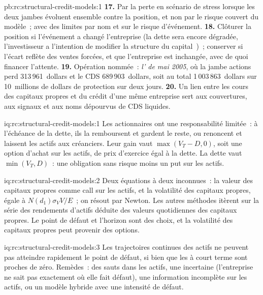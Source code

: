 \begin{solution}{pb:rc:structural-credit-models:1}
\textbf{17.} Par la perte en scénario de stress lorsque les deux jambes évoluent ensemble contre la position, et non par le
risque couvert du modèle~; avec des limites par nom et sur le risque d'événement.
\textbf{18.} Clôturer la position si l'événement a changé l'entreprise (la dette sera encore dégradée, l'investisseur
a l'intention de modifier la structure du capital~)~; conserver si l'écart reflète des ventes
forcées, et que l'entreprise est inchangée, avec de quoi financer l'attente.
\textbf{19.} Opération nommée~: \emph{l' de mai 2005}, où la jambe actions
perd 313\,961~dollars et le CDS 689\,903~dollars, soit au total 1\,003\,863~dollars sur
10~millions de dollars de protection sur deux jours.
\textbf{20.} Un lien entre les cours des capitaux propres et du crédit d'une même entreprise sert aux couvertures,
aux signaux et aux noms dépourvus de CDS liquides.
\end{solution}

\begin{solution}{iq:rc:structural-credit-models:1}
Les actionnaires ont une responsabilité limitée~: à l'échéance de la dette, ils la remboursent et gardent le reste,
ou renoncent et laissent les actifs aux créanciers. Leur gain vaut $\max(V_T-D,0)$, soit une option d'achat sur
les actifs, de prix d'exercice égal à la dette. La dette vaut $\min(V_T,D)$~: une obligation sans risque moins un put sur les
actifs.
\end{solution}

\begin{solution}{iq:rc:structural-credit-models:2}
Deux équations à deux inconnues~: la valeur des capitaux propres comme call sur les actifs, et la
volatilité des capitaux propres, égale à $N(d_1)\sigma_VV/E$~; on résout par Newton. Les autres méthodes itèrent sur la série des rendements
d'actifs déduite des valeurs quotidiennes des capitaux propres. Le point de défaut et l'horizon sont des choix, et
la volatilité des capitaux propres peut provenir des options.
\end{solution}

\begin{solution}{iq:rc:structural-credit-models:3}
Les trajectoires continues des actifs ne peuvent pas atteindre rapidement le point de défaut, si bien que les  à court terme
sont proches de zéro. Remèdes~: des sauts dans les actifs, une  incertaine
(l'entreprise ne sait pas exactement où elle fait défaut), une information incomplète sur les
actifs, ou un modèle hybride avec une intensité de défaut.
\end{solution}

